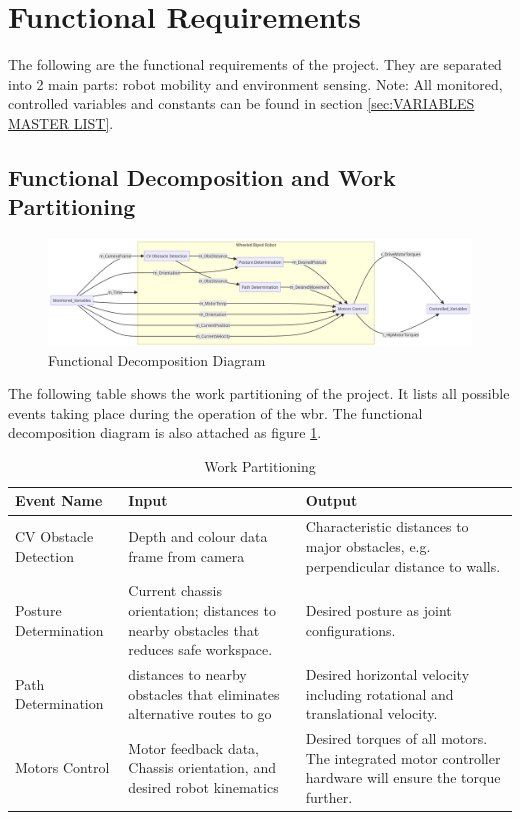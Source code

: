 \documentclass[12pt]{article}
\begin{document}
\section{Functional Requirements}
The following are the functional requirements of the project. They are separated into 2 main parts: robot mobility and environment sensing.
Note: All monitored, controlled variables and constants can be found in section \ref{sec:VARIABLES MASTER LIST}.
\subsection{Functional Decomposition and Work Partitioning}
\begin{figure}
    \centering
    \includegraphics[width=\textwidth,height=\textheight,keepaspectratio]{../Function_Decom.png}
    \caption{Functional Decomposition Diagram} \label{lbl:Function_Decom}
\end{figure}
The following table shows the work partitioning of the project. It lists all possible events taking place during the operation of the \acrshort{wbr}. The functional decomposition diagram is also attached as figure \ref{lbl:Function_Decom}.

\begin{table}[H]
    \caption{Work Partitioning}
    \begin{tabularx}{\textwidth}{|p{3cm}|X|X|}
        \toprule
        \textbf{Event Name} & \textbf{Input} & \textbf{Output}                         \\
        \midrule
        CV Obstacle Detection               & Depth and colour data frame from camera  & Characteristic distances to major obstacles, e.g. perpendicular distance to walls. \\
        \hline
        Posture Determination & Current chassis orientation; distances to nearby obstacles that reduces safe workspace. & Desired posture as joint configurations. \\
        \hline
        Path Determination & distances to nearby obstacles that eliminates alternative routes to go & Desired horizontal velocity including rotational and translational velocity. \\
        \hline
        Motors Control & Motor feedback data, Chassis orientation, and desired robot kinematics & Desired torques of all motors. The integrated motor controller hardware will ensure the torque further. \\
        \bottomrule
    \end{tabularx}
\end{table}
\end{document}
